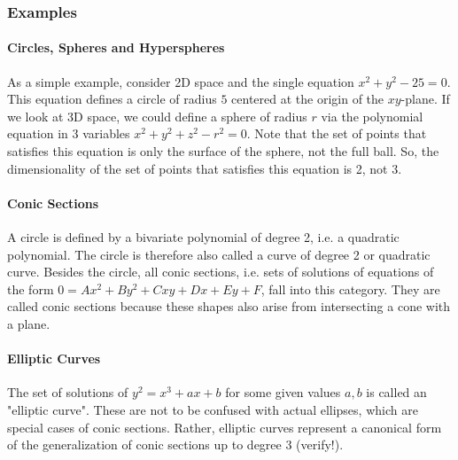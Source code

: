 






\subsubsection{Examples}

\paragraph{Circles, Spheres and Hyperspheres}
As a simple example, consider 2D space and the single equation $x^2 + y^2 - 25 = 0$. This equation defines a circle of radius $5$ centered at the origin of the $xy$-plane. If we look at 3D space, we could define a sphere of radius $r$ via the polynomial equation in 3 variables $x^2 + y^2 + z^2 - r^2 = 0$. Note that the set of points that satisfies this equation is only the surface of the sphere, not the full ball. So, the dimensionality of the set of points that satisfies this equation is 2, not 3. 

\paragraph{Conic Sections}
A circle is defined by a bivariate polynomial of degree 2, i.e. a quadratic polynomial. The circle is therefore also called a curve of degree 2 or quadratic curve. Besides the circle, all conic sections, i.e. sets of solutions of equations of the form $0 = A x^2 + B y^2 + C x y + D x + E y + F$, fall into this category. They are called conic sections because these shapes also arise from intersecting a cone with a plane.

\paragraph{Elliptic Curves}
The set of solutions of $y^2 = x^3 + a x + b$ for some given values $a,b$ is called an "elliptic curve". These are not to be confused with actual ellipses, which are special cases of conic sections. Rather, elliptic curves represent a canonical form of the generalization of conic sections up to degree 3 (verify!).



